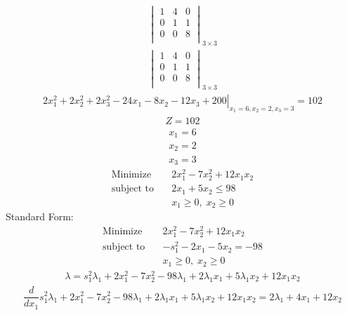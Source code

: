 \documentclass{article}
\begin{document}
\begin{align*}
\begin{vmatrix}
1 & 4 & 0\\
0 & 1 & 1\\
0 & 0 & 8\\
\end{vmatrix}_{3\times 3}
\end{align*}
\begin{align*}
\begin{vmatrix}
1 & 4 & 0\\
0 & 1 & 1\\
0 & 0 & 8\\
\end{vmatrix}_{3\times 3}
\end{align*}
\begin{align*}
\left.2x_{1}^{2} + 2x_{2}^{2} + 2x_{3}^{2} - 24x_{1} - 8x_{2} - 12x_{3} + 200\right|_{x_{1}=6,x_{2}=2,x_{3}=3}=102\end{align*}
\begin{align*}
Z=102\end{align*}
\begin{align*}
x_{1}=6\end{align*}
\begin{align*}
x_{2}=2\end{align*}
\begin{align*}
x_{3}=3\end{align*}
\begin{align*}
\text{Minimize} \quad & 2x_{1}^{2} - 7x_{2}^{2} + 12x_{1}x_{2}\\
\text{subject to} \quad
& 2x_{1} + 5x_{2}\le98\\
& x_{1}\ge0,\; x_{2}\ge0\end{align*}
Standard Form:\\
\begin{align*}
\text{Minimize} \quad & 2x_{1}^{2} - 7x_{2}^{2} + 12x_{1}x_{2}\\
\text{subject to} \quad
& -s_{1}^{2} - 2x_{1} - 5x_{2}=-98\\
& x_{1}\ge0,\; x_{2}\ge0\end{align*}
\begin{align*}
\lambda=s_{1}^{2}\lambda_{1} + 2x_{1}^{2} - 7x_{2}^{2} - 98\lambda_{1} + 2\lambda_{1}x_{1} + 5\lambda_{1}x_{2} + 12x_{1}x_{2}\end{align*}
\begin{align*}
\dfrac{d}{dx_{1}}s_{1}^{2}\lambda_{1} + 2x_{1}^{2} - 7x_{2}^{2} - 98\lambda_{1} + 2\lambda_{1}x_{1} + 5\lambda_{1}x_{2} + 12x_{1}x_{2}=2\lambda_{1} + 4x_{1} + 12x_{2}\end{align*}
\end{document}
